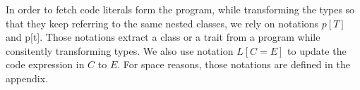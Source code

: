 
In order to fetch code literals form the program, while transforming the types so that they keep referring to the same nested classes, we rely on notations
$p[T]$ and p[t].
Those notations extract a class or a trait from a program while consitently transforming types.
We also use notation $L[C=E]$ to update the code expression in $C$ to $E$.
For space reasons, those notations are defined in the appendix.




\begin{comment}
Define operations on p
--------------------------------------
p.evilPush(L) = (C = L, p)
	for fresh C

p.push(id) = (id = L, p)
    p = (id' = {_;_, id = L, _ ;_}, _; Ds)

(id = L, p).pop() = p
(id = L, p).top() = L

Define equivy ops...
------------------------------
empty =p empty
P, Ps =p P', Ps' iff:
	p.minimize(P) = p.minimize(P')
	Ps =p Ps'

Pz subseteq_p Pz' iff:
	p.minimize(Pz) subseteq p.minimize(Pz')

p.minimize(empty) = empty
p.minimize(P, Pz) = p.minimize(P), p.minimize(Pz)

p.minimize(Thisn+1.idn.Cs) = p.minimize(Thisn.Cs):
  p = id0 = L0, ..., idn = Ln, _; Ds
  p(Thisn.Cs) = L
  // TODO: Check that Ln is an LV instead?

otherwise p.minimize(P) = P

define dom(Mz) = Midz
===========================================
dom(empty) = empty
dom(C = E, Mz) = C, dom(Mz)
dom(T m(Txs), Mz) = m, dom(Mz)
\end{comment}

